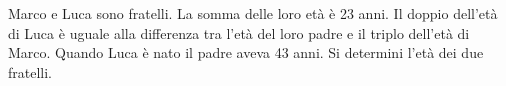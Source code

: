 Marco e Luca sono fratelli. La somma delle loro età è 23 anni. Il doppio dell’età di Luca è uguale alla differenza
tra l’età del loro padre e il triplo dell’età di Marco. Quando Luca è nato il padre aveva 43 anni. 
Si determini l'età dei due fratelli.
